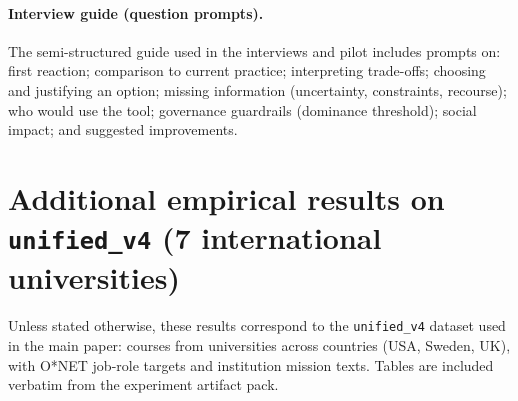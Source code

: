 \documentclass{article}
\begin{document}
\paragraph{Interview guide (question prompts).} The semi-structured guide used in the interviews and pilot includes prompts on: first reaction; comparison to current practice; interpreting trade-offs; choosing and justifying an option; missing information (uncertainty, constraints, recourse); who would use the tool; governance guardrails (dominance threshold); social impact; and suggested improvements.

\section{Additional empirical results on \texttt{unified\_v4} (7 international universities)}
\label{sec:supp-results}
Unless stated otherwise, these results correspond to the \texttt{unified\_v4} dataset used in the main paper: {\NumCourses} courses from {\NumUniversities} universities across {\NumCountries} countries (USA, Sweden, UK), with {\NumOccupations} O*NET job-role targets and {\NumMissionsMain} institution mission texts. Tables are included verbatim from the experiment artifact pack.










\end{document}

